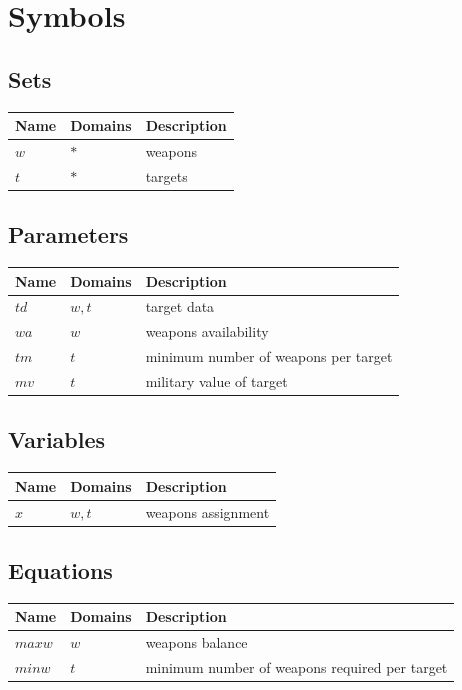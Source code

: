 \documentclass[11pt]{article}
\begin{document}
\section*{Symbols}


\subsection*{Sets}
\begin{tabularx}{\textwidth}{| l | l | X |}
\hline
\textbf{Name} & \textbf{Domains} & \textbf{Description}\\
\hline
\endhead

$w$ & $*$ & weapons\\
$t$ & $*$ & targets\\
\hline
\end{tabularx}
\subsection*{Parameters}
\begin{tabularx}{\textwidth}{| l | l | X |}
\hline
\textbf{Name} & \textbf{Domains} & \textbf{Description}\\
\hline
\endhead

$td$ & $w,t$ & target data\\
$wa$ & $w$ & weapons availability\\
$tm$ & $t$ & minimum number of weapons per target\\
$mv$ & $t$ & military value of target\\
\hline
\end{tabularx}
\subsection*{Variables}
\begin{tabularx}{\textwidth}{| l | l | X |}
\hline
\textbf{Name} & \textbf{Domains} & \textbf{Description}\\
\hline
\endhead

$x$ & $w,t$ & weapons assignment\\
\hline
\end{tabularx}
\subsection*{Equations}
\begin{tabularx}{\textwidth}{| l | l | X |}
\hline
\textbf{Name} & \textbf{Domains} & \textbf{Description}\\
\hline
\endhead

$maxw$ & $w$ & weapons balance\\
$minw$ & $t$ & minimum number of weapons required per target\\
\hline
\end{tabularx}
\end{document}
